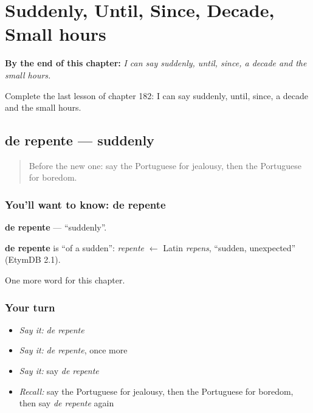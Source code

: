 
\chapter{Suddenly, Until, Since, Decade, Small hours}
\label{ch:pt-suddenly-until-since-decade-small-hours}

\begin{chapteropening}
\textbf{By the end of this chapter:} \emph{I can say suddenly, until, since, a decade and the small hours.}

Complete the last lesson of chapter 182: I can say suddenly, until, since, a decade and the small hours.
\end{chapteropening}

\section[de repente]{de repente — suddenly}

\label{lesson:PT-C182-de-repente}



\begin{quote}
Before the new one: say the Portuguese for jealousy, then the Portuguese for boredom.
\end{quote}

\subsection*{You'll want to know: de repente}
\textbf{de repente} — \textquotedblleft{}suddenly\textquotedblright{}.

\begin{cousinweb}
\textbf{de repente} is \textquotedblleft{}of a sudden\textquotedblright{}: \emph{repente} $\leftarrow$ Latin \emph{repens}, \textquotedblleft{}sudden, unexpected\textquotedblright{} (EtymDB 2.1).
\end{cousinweb}

\begin{grammarlens}[title={What you've built}]
One more word for this chapter.
\end{grammarlens}

\subsection*{Your turn}
\begin{itemize}
\raggedright
  \item \emph{Say it:} \emph{de repente}
  \item \emph{Say it:} \emph{de repente}, once more
  \item \emph{Say it:} say \emph{de repente}
  \item \emph{Recall:} say the Portuguese for jealousy, then the Portuguese for boredom, then say \emph{de repente} again
\end{itemize}

